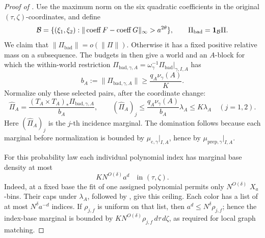 \begin{proof}[Proof of ]
Use the maximum norm on the six quadratic coefficients in the
original \((\tau,\zeta)\)-coordinates, and define
\[
 \mathcal B
   =\{(\xi_1,\xi_2):\|\operatorname{coeff}F-
                              \operatorname{coeff}G\|_\infty
                              >a^{2\theta}\},\qquad
 \Pi_{\mathrm{bad}}=\mathbf 1_{\mathcal B}\Pi.
\]
We claim that \(\|\Pi_{\mathrm{bad}}\|=o(\|\Pi\|)\).
Otherwise it has a fixed positive relative mass on a subsequence.
The budgets in  then give a world and an
\(A\)-block for which the within-world restriction
\(\Pi_{\mathrm{bad},\gamma,A}
 =\omega_\gamma^{-1}\Pi_{\mathrm{bad}}|_{\gamma,I,A}\) has
\[
 b_A:=\|\Pi_{\mathrm{bad},\gamma,A}\|
       \ge\frac{q_A\nu_\gamma(A)}{K}.
\]
Normalize only these selected pairs, after the coordinate change:
\begin{equation}
 \label{a08:bad-pair-normalization}
 \widehat\Pi_A
   =\frac{(T_A\times T_A)_*\Pi_{\mathrm{bad},\gamma,A}}{b_A},
 \qquad
 (\widehat\Pi_A)_j
   \le\frac{q_A\nu_\gamma(A)}{b_A}\lambda_A
   \le K\lambda_A\quad(j=1,2).
\end{equation}
Here \((\widehat\Pi_A)_j\) is the \(j\)-th incidence marginal.
The domination follows because each marginal before normalization
is bounded by \(\mu_{\mathrm c,\gamma}|_{I,A}\), hence by
\(\mu_{\mathrm{prep},\gamma}|_{I,A}\).

For this probability law each individual polynomial index has
marginal base density at most
\begin{equation}
 \label{a08:index-base-ceiling}
 KN^{O(\delta)}a^d
 \quad\text{in }(\tau,\zeta).
\end{equation}
Indeed, at a fixed base the fit of one assigned polynomial permits
only \(N^{O(\delta)}\) \(X_a\)-bins.  Their caps under
\(\lambda_A\), followed by , give
this ceiling.  Each color has a list of at most
\(N^\delta a^{-d}\) indices.  If \(\rho_{j,f}\) is uniform on that
list, then \(a^d\le N^\delta\rho_{j,f}\); hence the index-base
marginal is bounded by
\(KN^{O(\delta)}\rho_{j,f}\,d\tau\,d\zeta\), as required for
local graph matching.


\end{proof}
